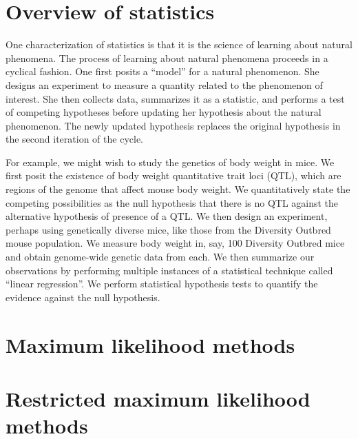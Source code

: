 \section{Overview of statistics}

One characterization of statistics is that it is the science of learning
about natural phenomena. The process of learning about natural phenomena proceeds
in a cyclical fashion. One first posits a ``model'' for a natural phenomenon.
She designs an experiment to measure a quantity related to the phenomenon of interest.
She then collects data, summarizes it as a statistic, and performs a test of
competing hypotheses before updating her hypothesis about the natural phenomenon.
The newly updated hypothesis replaces the original hypothesis in the second
iteration of the cycle. 

For example, we might wish to study the genetics of body weight in mice. 
We first posit the existence of body weight quantitative trait loci (QTL), which
are regions of the genome that affect mouse body weight. We quantitatively state the competing possibilities as the null hypothesis that there is no QTL against the alternative hypothesis of presence of a QTL. We then design an experiment, perhaps using genetically diverse mice, like those from the Diversity Outbred mouse population. We measure body weight in, say, 100 Diversity Outbred mice and obtain genome-wide genetic data from each. We then summarize our observations by performing multiple instances of a statistical technique called ``linear regression''. We perform statistical hypothesis tests to quantify the evidence against the null hypothesis.  

\section{Maximum likelihood methods}




\section{Restricted maximum likelihood methods}

